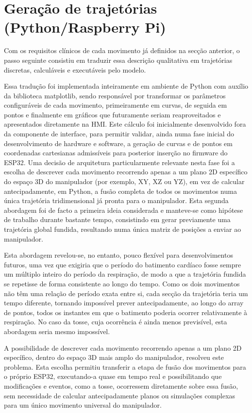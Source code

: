\section{Geração de trajetórias (Python/Raspberry Pi)}
\label{sec:geracao-trajetorias}
Com os requisitos clínicos de cada movimento já definidos na secção anterior, o passo seguinte consistiu em traduzir essa descrição qualitativa em trajetórias discretas, calculáveis e executáveis pelo modelo.

Essa tradução foi implementada inteiramente em ambiente de Python com auxílio da biblioteca matplotlib, sendo responsável por transformar os parâmetros configuráveis de cada movimento, primeiramente em curvas, de seguida em pontos e finalmente em gráficos que futuramente seriam reaproveitados e apresentados diretamente na HMI. Este cálculo foi inicialmente desenvolvido fora da componente de interface, para permitir validar, ainda numa fase inicial do desenvolvimento de hardware e software, a geração de curvas e de pontos em coordenadas cartesianas admissíveis para posterior inserção no firmware do ESP32. Uma decisão de arquitetura particularmente relevante nesta fase foi a escolha de descrever cada movimento recorrendo apenas a um plano 2D específico do espaço 3D do manipulador (por exemplo, XY, XZ ou YZ), em vez de calcular antecipadamente, em Python, a fusão completa de todos os movimentos numa única trajetória tridimensional já pronta para o manipulador. Esta segunda abordagem foi de facto a primeira ideia considerada e manteve-se como hipótese de trabalho durante bastante tempo, consistindo em gerar previamente uma trajetória global fundida, resultando numa única matriz de posições a enviar ao manipulador.

Esta abordagem revelou-se, no entanto, pouco flexível para desenvolvimentos futuros, uma vez que exigiria que o período do batimento cardíaco fosse sempre um múltiplo inteiro do período da respiração, de modo a que a trajetória fundida se repetisse de forma consistente ao longo do tempo. Como os dois movimentos não têm uma relação de período exata entre si, cada secção da trajetória teria um tempo diferente, tornando impossível prever antecipadamente, ao longo do array de pontos, todos os instantes em que o batimento poderia ocorrer relativamente à respiração. No caso da tosse, cuja ocorrência é ainda menos previsível, esta abordagem seria mesmo impossível.

A possibilidade de descrever cada movimento recorrendo apenas a um plano 2D específico, dentro do espaço 3D mais amplo do manipulador, resolveu este problema. Esta escolha permitiu transferir a etapa de fusão dos movimentos para o próprio ESP32, executando-a quase em tempo real e possibilitando que modificações e eventos, como a tosse, ocorressem diretamente sobre essa fusão, sem necessidade de calcular antecipadamente planos ou simulações complexas para um único movimento universal do manipulador.

